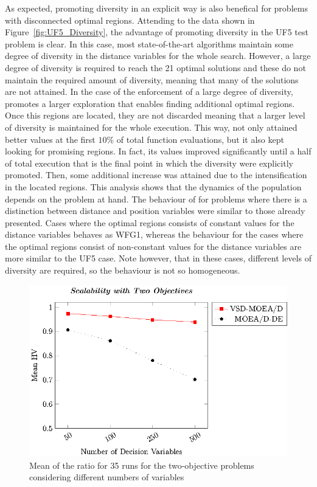 As expected, promoting diversity in an explicit way is also benefical for problems with disconnected optimal regions.
%
Attending to the data shown in Figure~\ref{fig:UF5_Diversity}, the advantage of promoting diversity in the UF5 test 
problem is clear.
%
In this case, most state-of-the-art algorithms maintain some degree of diversity in the distance variables for
the whole search.
%
However, a large degree of diversity is required to reach the 21 optimal solutions and these \MOEAS{} do not maintain
the required amount of diversity, meaning that many of the solutions are not attained.
%
In the case of \AVSDMOEAD{} the enforcement of a large degree of diversity, promotes a larger exploration that enables finding
additional optimal regions.
%
Once this regions are located, they are not discarded meaning that a larger level of diversity is maintained for the whole
execution.
%
This way, \AVSDMOEAD{} not only attained better \HV{} values at the first $10\%$ of total function evaluations, but 
it also kept looking for promising regions.
%
In fact, its \HV{} values improved significantly until a half of total execution that is the final point in which the diversity 
were explicitly promoted.
%
Then, some additional increase was attained due to the intensification in the located regions.
%
This analysis shows that the dynamics of the population depends on the problem at hand.
%
The behaviour of \AVSDMOEAD{} for problems where there is a distinction between distance and position variables 
were similar to those already presented.
%
Cases where the optimal regions consists of constant values for the distance variables behaves as WFG1, whereas
the behaviour for the cases where the optimal regions consist of non-constant values for the distance variables are
more similar to the UF5 case.
%
Note however, that in these cases, different levels of diversity are required, so the behaviour is not so homogeneous.

\begin{figure}[t]
\centering
\includegraphics[scale=0.75]{images/Graphic-Scalability-2obj_tikz-figure0.eps}
\caption{Mean of the \HV{} ratio for 35 runs for the two-objective problems considering different numbers of variables}\label{fig:scalability-2obj}
\end{figure}

